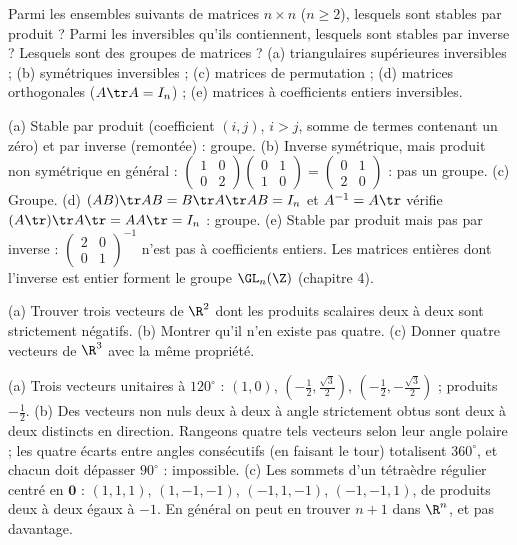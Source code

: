 \begin{exo}
Parmi les ensembles suivants de matrices $n\times n$ ($n\ge2$), lesquels sont stables par produit ? Parmi les inversibles qu'ils contiennent, lesquels sont stables par inverse ? Lesquels sont des groupes de matrices ? (a) triangulaires supérieures inversibles ; (b) symétriques inversibles ; (c) matrices de permutation ; (d) matrices orthogonales ($A\tr A=I_n$) ; (e) matrices à coefficients entiers inversibles.
\begin{corrige}
(a) Stable par produit (coefficient $(i,j)$, $i>j$, somme de termes contenant un zéro) et par inverse (remontée) : groupe. (b) Inverse symétrique, mais produit non symétrique en général : $\begin{pmatrix}1&0\\0&2\end{pmatrix}\begin{pmatrix}0&1\\1&0\end{pmatrix}=\begin{pmatrix}0&1\\2&0\end{pmatrix}$ : pas un groupe. (c) Groupe. (d) $(AB)\tr AB=B\tr A\tr AB=I_n$ et $A^{-1}=A\tr$ vérifie $(A\tr)\tr A\tr=AA\tr=I_n$ : groupe. (e) Stable par produit mais pas par inverse : $\begin{pmatrix}2&0\\0&1\end{pmatrix}^{-1}$ n'est pas à coefficients entiers. Les matrices entières dont l'inverse est entier forment le groupe $\GL_n(\Z)$ (chapitre 4).
\end{corrige}
\end{exo}
\begin{exo}
(a) Trouver trois vecteurs de $\R^2$ dont les produits scalaires deux à deux sont strictement négatifs. (b) Montrer qu'il n'en existe pas quatre. (c) Donner quatre vecteurs de $\R^3$ avec la même propriété.
\begin{corrige}
(a) Trois vecteurs unitaires à $120^\circ$ : $(1,0)$, $(-\frac12,\frac{\sqrt3}2)$, $(-\frac12,-\frac{\sqrt3}2)$ ; produits $-\frac12$. (b) Des vecteurs non nuls deux à deux à angle strictement obtus sont deux à deux distincts en direction. Rangeons quatre tels vecteurs selon leur angle polaire ; les quatre écarts entre angles consécutifs (en faisant le tour) totalisent $360^\circ$, et chacun doit dépasser $90^\circ$ : impossible. (c) Les sommets d'un tétraèdre régulier centré en $\mathbf 0$ : $(1,1,1)$, $(1,-1,-1)$, $(-1,1,-1)$, $(-1,-1,1)$, de produits deux à deux égaux à $-1$. En général on peut en trouver $n+1$ dans $\R^n$, et pas davantage.
\end{corrige}
\end{exo}
